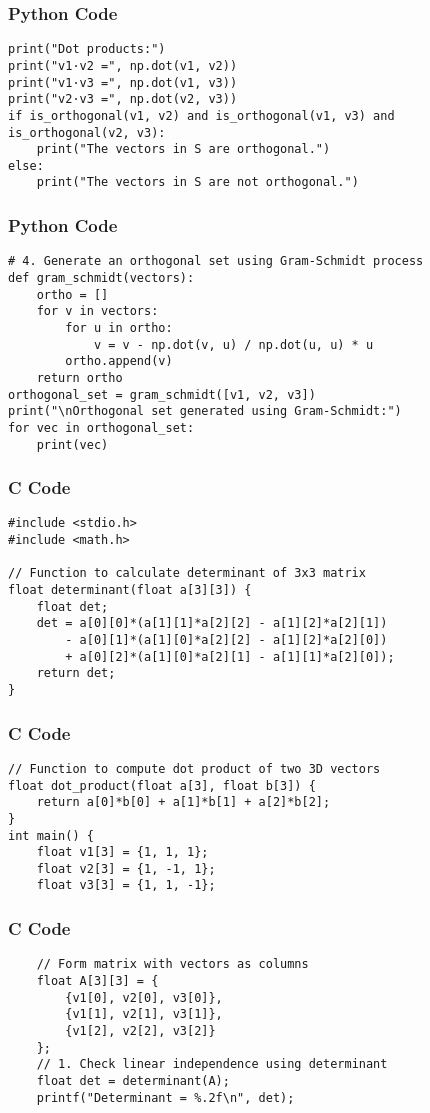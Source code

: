 \documentclass{beamer}
\begin{document}
\begin{frame}[fragile]
\frametitle{Python Code}
\begin{lstlisting}
print("Dot products:")
print("v1·v2 =", np.dot(v1, v2))
print("v1·v3 =", np.dot(v1, v3))
print("v2·v3 =", np.dot(v2, v3))
if is_orthogonal(v1, v2) and is_orthogonal(v1, v3) and is_orthogonal(v2, v3):
    print("The vectors in S are orthogonal.")
else:
    print("The vectors in S are not orthogonal.")
\end{lstlisting}
\end{frame}

\begin{frame}[fragile]
\frametitle{Python Code}
\begin{lstlisting}
# 4. Generate an orthogonal set using Gram-Schmidt process
def gram_schmidt(vectors):
    ortho = []
    for v in vectors:
        for u in ortho:
            v = v - np.dot(v, u) / np.dot(u, u) * u
        ortho.append(v)
    return ortho
orthogonal_set = gram_schmidt([v1, v2, v3])
print("\nOrthogonal set generated using Gram-Schmidt:")
for vec in orthogonal_set:
    print(vec)
\end{lstlisting}
\end{frame}

\begin{frame}[fragile]
\frametitle{C Code}
\begin{lstlisting}
#include <stdio.h>
#include <math.h>

// Function to calculate determinant of 3x3 matrix
float determinant(float a[3][3]) {
    float det;
    det = a[0][0]*(a[1][1]*a[2][2] - a[1][2]*a[2][1])
        - a[0][1]*(a[1][0]*a[2][2] - a[1][2]*a[2][0])
        + a[0][2]*(a[1][0]*a[2][1] - a[1][1]*a[2][0]);
    return det;
}
\end{lstlisting}
\end{frame}

\begin{frame}[fragile]
\frametitle{C Code}
\begin{lstlisting}
// Function to compute dot product of two 3D vectors
float dot_product(float a[3], float b[3]) {
    return a[0]*b[0] + a[1]*b[1] + a[2]*b[2];
}
int main() {
    float v1[3] = {1, 1, 1};
    float v2[3] = {1, -1, 1};
    float v3[3] = {1, 1, -1};
\end{lstlisting}
\end{frame}

\begin{frame}[fragile]
\frametitle{C Code}
\begin{lstlisting}
    // Form matrix with vectors as columns
    float A[3][3] = {
        {v1[0], v2[0], v3[0]},
        {v1[1], v2[1], v3[1]},
        {v1[2], v2[2], v3[2]}
    };
    // 1. Check linear independence using determinant
    float det = determinant(A);
    printf("Determinant = %.2f\n", det);
\end{lstlisting}
\end{frame}
\end{document}
